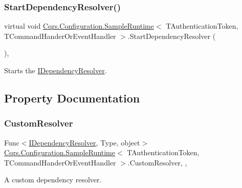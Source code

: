 \subsubsection{\texorpdfstring{Start\+Dependency\+Resolver()}{StartDependencyResolver()}}
{\footnotesize\ttfamily virtual void \hyperlink{classCqrs_1_1Configuration_1_1SampleRuntime}{Cqrs.\+Configuration.\+Sample\+Runtime}$<$ T\+Authentication\+Token, T\+Command\+Hander\+Or\+Event\+Handler $>$.Start\+Dependency\+Resolver (\begin{DoxyParamCaption}{ }\end{DoxyParamCaption})\hspace{0.3cm}{\ttfamily [protected]}, {\ttfamily [virtual]}}



Starts the \hyperlink{interfaceCqrs_1_1Configuration_1_1IDependencyResolver}{I\+Dependency\+Resolver}. 



\subsection{Property Documentation}
\mbox{\label{classCqrs_1_1Configuration_1_1SampleRuntime_abf9adc15d9a99c70ab60792c37a619f0_abf9adc15d9a99c70ab60792c37a619f0}} 
\subsubsection{\texorpdfstring{Custom\+Resolver}{CustomResolver}}
{\footnotesize\ttfamily Func$<$\hyperlink{interfaceCqrs_1_1Configuration_1_1IDependencyResolver}{I\+Dependency\+Resolver}, Type, object$>$ \hyperlink{classCqrs_1_1Configuration_1_1SampleRuntime}{Cqrs.\+Configuration.\+Sample\+Runtime}$<$ T\+Authentication\+Token, T\+Command\+Hander\+Or\+Event\+Handler $>$.Custom\+Resolver\hspace{0.3cm}{\ttfamily [static]}, {\ttfamily [get]}, {\ttfamily [set]}}



A custom dependency resolver. 

\mbox{\label{classCqrs_1_1Configuration_1_1SampleRuntime_a9038dd478bcafb2f5f65cbcbada712db_a9038dd478bcafb2f5f65cbcbada712db}} 
